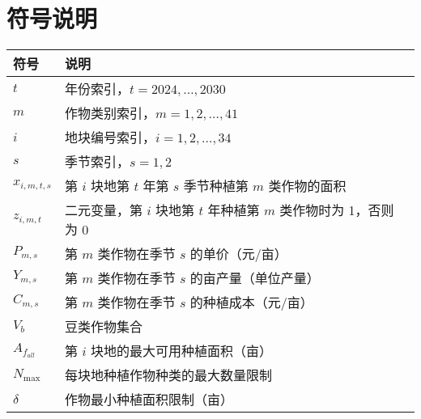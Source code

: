 \chapter[\hspace{0pt}符号说明]{{\heiti{}\hspace{0pt}符号说明}}\label{chapter4: 符号说明}



\begin{table}[htbp]
  \captionsetup{labelformat=empty}     %
  \renewcommand{\arraystretch}{1.25}   %
  \small                               %

  \begin{tabularx}{\textwidth}{|C|D|U|}
    \hline
      \textbf{符号} & \textbf{说明}\\
    \hline
$ t $ & 年份索引，$t = 2024, \dots, 2030$ \\
$ m $ & 作物类别索引，$m = 1, 2, \dots, 41$ \\
$ i $ & 地块编号索引，$i = 1, 2, \dots, 34$ \\
$ s $ & 季节索引，$s = 1, 2$ \\
$ x_{i,m,t,s} $ & 第 $i$ 块地第 $t$ 年第 $s$ 季节种植第 $m$ 类作物的面积 \\
$ z_{i,m,t} $ & 二元变量，第 $i$ 块地第 $t$ 年种植第 $m$ 类作物时为 1，否则为 0 \\
$ P_{m,s} $ & 第 $m$ 类作物在季节 $s$ 的单价（元/亩） \\
$ Y_{m,s} $ & 第 $m$ 类作物在季节 $s$ 的亩产量（单位产量） \\
$ C_{m,s} $ & 第 $m$ 类作物在季节 $s$ 的种植成本（元/亩） \\
$ V_b $ & 豆类作物集合 \\
$ A_{f_{all}} $ & 第 $i$ 块地的最大可用种植面积（亩） \\
$ N_{\max} $ & 每块地种植作物种类的最大数量限制 \\
$ \delta $ & 作物最小种植面积限制（亩） \\


\end{tabularx}
\end{table}
